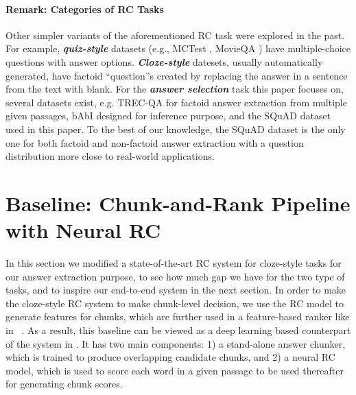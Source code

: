 \documentclass[letterpaper]{article}
\begin{document}
\paragraph{Remark: Categories of RC Tasks}
Other simpler variants of the aforementioned RC task were explored in the past.
For example, \textbf{\emph{quiz-style}} datasets (e.g., MCTest \cite{richardson2013mctest}, MovieQA \cite{tapaswi2015movieqa}) have multiple-choice questions with answer options. \textbf{\emph{Cloze-style}} datesets\cite{hermann2015teaching,hill2015goldilocks,onishi-16}, usually automatically generated, have factoid ``question''s created by replacing the answer in a sentence from the text with blank. For the \textbf{\emph{answer selection}} task this paper focuses on, several datasets exist, e.g. TREC-QA for factoid answer extraction from multiple given passages, bAbI \cite{DBLP:journals/corr/WestonCB14} designed for inference purpose, and the SQuAD dataset \cite{rajpurkar2016squad} used in this paper. To the best of our knowledge, the SQuAD dataset is the only one for both factoid and non-factoid answer extraction with a question distribution more close to real-world applications.












\section{Baseline: Chunk-and-Rank Pipeline with Neural RC}
\label{sect_baseline}
In this section we modified a state-of-the-art RC system for cloze-style tasks for our answer extraction purpose, to see how much gap we have for the two type of tasks, and to inspire our end-to-end system in the next section.
In order to make the cloze-style RC system to make chunk-level decision, we use the RC model to generate features for chunks, which are further used in a feature-based ranker like in ~\cite{rajpurkar2016squad}.
As a result, this baseline can be viewed as a deep learning based counterpart of the system in \cite{rajpurkar2016squad}. It has two main components: 1) a stand-alone answer chunker, which is trained to produce overlapping candidate chunks, and 2) a neural RC model, which is used to score each word in a given passage to be used thereafter for generating chunk scores.
\end{document}
